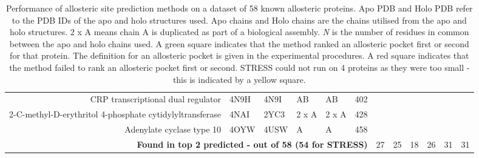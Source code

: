 \begin{table}
\begin{scriptsize}
\begin{tabular}{rrrrrrrrrrrr}
\multicolumn{1}{r}{CRP transcriptional dual regulator} & \multicolumn{1}{l}{4N9H} & \multicolumn{1}{l}{4N9I} & \multicolumn{1}{l}{AB} & \multicolumn{1}{l}{AB} & 402   & \cellcolor[rgb]{ .573,  .816,  .314}  & \cellcolor[rgb]{ .573,  .816,  .314}  & \cellcolor[rgb]{ .573,  .816,  .314}  & \cellcolor[rgb]{ .573,  .816,  .314}  & \cellcolor[rgb]{ .573,  .816,  .314}  & \cellcolor[rgb]{ .573,  .816,  .314}  \\
\multicolumn{1}{r}{2-C-methyl-D-erythritol 4-phosphate cytidylyltransferase} & \multicolumn{1}{l}{4NAI} & \multicolumn{1}{l}{2YC3} & \multicolumn{1}{l}{2 x A} & \multicolumn{1}{l}{2 x A} & 428   & \cellcolor[rgb]{ 1,  .494,  .475}  & \cellcolor[rgb]{ 1,  .494,  .475}  & \cellcolor[rgb]{ 1,  .494,  .475}  & \cellcolor[rgb]{ 1,  .494,  .475}  & \cellcolor[rgb]{ 1,  .494,  .475}  & \cellcolor[rgb]{ .573,  .816,  .314}  \\
\multicolumn{1}{r}{Adenylate cyclase type 10} & \multicolumn{1}{l}{4OYW} & \multicolumn{1}{l}{4USW} & \multicolumn{1}{l}{A} & \multicolumn{1}{l}{A} & 458   & \cellcolor[rgb]{ 1,  .494,  .475}  & \cellcolor[rgb]{ 1,  .494,  .475}  & \cellcolor[rgb]{ 1,  .494,  .475}  & \cellcolor[rgb]{ 1,  .494,  .475}  & \cellcolor[rgb]{ .573,  .816,  .314}  & \cellcolor[rgb]{ .573,  .816,  .314}  \\
\hline
\multicolumn{6}{r}{\textbf{Found in top 2 predicted - out of 58 (54 for STRESS)}} & 27    & 25    & 18    & 26    & 31    & 31 \\
\hline
\end{tabular}
\end{scriptsize}

\caption{Performance of allosteric site prediction methods on a dataset of 58 known allosteric proteins.
Apo PDB and Holo PDB refer to the PDB IDs of the apo and holo structures used.
Apo chains and Holo chains are the chains utilised from the apo and holo structures.
2 x A means chain A is duplicated as part of a biological assembly.
\textit{N} is the number of residues in common between the apo and holo chains used.
A green square indicates that the method ranked an allosteric pocket first or second for that protein.
The definition for an allosteric pocket is given in the experimental procedures.
A red square indicates that the method failed to rank an allosteric pocket first or second.
STRESS could not run on 4 proteins as they were too small - this is indicated by a yellow square.}

\label{tab:allosteric_proteins}
\end{table}


